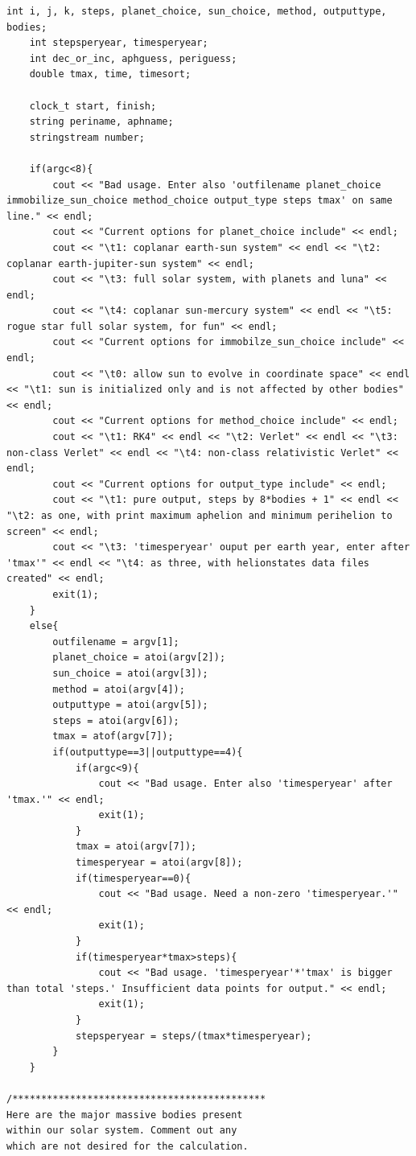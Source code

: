 \documentclass[11pt,a4paper]{article}
\begin{document}
\begin{lstlisting}[title={project3.cpp}]
	int i, j, k, steps, planet_choice, sun_choice, method, outputtype, bodies;
	int stepsperyear, timesperyear;
	int dec_or_inc, aphguess, periguess;
	double tmax, time, timesort;

	clock_t start, finish;
	string periname, aphname;
	stringstream number;

	if(argc<8){
		cout << "Bad usage. Enter also 'outfilename planet_choice immobilize_sun_choice method_choice output_type steps tmax' on same line." << endl;
		cout << "Current options for planet_choice include" << endl;
		cout << "\t1: coplanar earth-sun system" << endl << "\t2: coplanar earth-jupiter-sun system" << endl;
		cout << "\t3: full solar system, with planets and luna" << endl;
		cout << "\t4: coplanar sun-mercury system" << endl << "\t5: rogue star full solar system, for fun" << endl;
		cout << "Current options for immobilze_sun_choice include" << endl;
		cout << "\t0: allow sun to evolve in coordinate space" << endl << "\t1: sun is initialized only and is not affected by other bodies" << endl;
		cout << "Current options for method_choice include" << endl;
		cout << "\t1: RK4" << endl << "\t2: Verlet" << endl << "\t3: non-class Verlet" << endl << "\t4: non-class relativistic Verlet" << endl;
		cout << "Current options for output_type include" << endl;
		cout << "\t1: pure output, steps by 8*bodies + 1" << endl << "\t2: as one, with print maximum aphelion and minimum perihelion to screen" << endl;
		cout << "\t3: 'timesperyear' ouput per earth year, enter after 'tmax'" << endl << "\t4: as three, with helionstates data files created" << endl;
		exit(1);
	}
	else{
		outfilename = argv[1];
		planet_choice = atoi(argv[2]);
		sun_choice = atoi(argv[3]);
		method = atoi(argv[4]);
		outputtype = atoi(argv[5]);
		steps = atoi(argv[6]);
		tmax = atof(argv[7]);
		if(outputtype==3||outputtype==4){
			if(argc<9){
				cout << "Bad usage. Enter also 'timesperyear' after 'tmax.'" << endl;
				exit(1);
			}
			tmax = atoi(argv[7]);
			timesperyear = atoi(argv[8]);
			if(timesperyear==0){
				cout << "Bad usage. Need a non-zero 'timesperyear.'" << endl;
				exit(1);
			}
			if(timesperyear*tmax>steps){
				cout << "Bad usage. 'timesperyear'*'tmax' is bigger than total 'steps.' Insufficient data points for output." << endl;
				exit(1);
			}
			stepsperyear = steps/(tmax*timesperyear);
		}	
	}
		
/********************************************
Here are the major massive bodies present 
within our solar system. Comment out any
which are not desired for the calculation.


\end{lstlisting}
\end{document}
